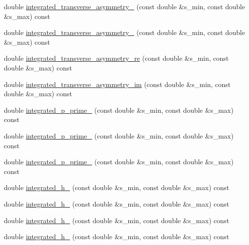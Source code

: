 \begin{DoxyCompactItemize}
\item 
double \hyperlink{classeos_1_1BToKstarDilepton_3_01LargeRecoil_01_4_a745412c6ccdb663f905f06be923082f2}{integrated\_\-transverse\_\-asymmetry\_} (const double \&s\_\-min, const double \&s\_\-max) const 
\item 
double \hyperlink{classeos_1_1BToKstarDilepton_3_01LargeRecoil_01_4_aff2ff1bed79cb777349b6e9bdf20cd66}{integrated\_\-transverse\_\-asymmetry\_} (const double \&s\_\-min, const double \&s\_\-max) const 
\item 
double \hyperlink{classeos_1_1BToKstarDilepton_3_01LargeRecoil_01_4_a535ddfbdc0000407bd98814504308556}{integrated\_\-transverse\_\-asymmetry\_\-re} (const double \&s\_\-min, const double \&s\_\-max) const 
\item 
double \hyperlink{classeos_1_1BToKstarDilepton_3_01LargeRecoil_01_4_a2e38ce6db1732ee1452203414b9c7280}{integrated\_\-transverse\_\-asymmetry\_\-im} (const double \&s\_\-min, const double \&s\_\-max) const 
\item 
double \hyperlink{classeos_1_1BToKstarDilepton_3_01LargeRecoil_01_4_a9c42a3d8488509596ae4292000e03010}{integrated\_\-p\_\-prime\_} (const double \&s\_\-min, const double \&s\_\-max) const 
\item 
double \hyperlink{classeos_1_1BToKstarDilepton_3_01LargeRecoil_01_4_a53a468080844fbd3966da39a70018d5f}{integrated\_\-p\_\-prime\_} (const double \&s\_\-min, const double \&s\_\-max) const 
\item 
double \hyperlink{classeos_1_1BToKstarDilepton_3_01LargeRecoil_01_4_a4c040333bb5e90385f38c6990cf7dacc}{integrated\_\-p\_\-prime\_} (const double \&s\_\-min, const double \&s\_\-max) const 
\item 
double \hyperlink{classeos_1_1BToKstarDilepton_3_01LargeRecoil_01_4_a9406f153b7bcda724228031edccb4eff}{integrated\_\-h\_} (const double \&s\_\-min, const double \&s\_\-max) const 
\item 
double \hyperlink{classeos_1_1BToKstarDilepton_3_01LargeRecoil_01_4_ace2820ec3a4e8d3eda907e764ab57c22}{integrated\_\-h\_} (const double \&s\_\-min, const double \&s\_\-max) const 
\item 
double \hyperlink{classeos_1_1BToKstarDilepton_3_01LargeRecoil_01_4_aa2dd5c9566afd338c8edf08fc81f488a}{integrated\_\-h\_} (const double \&s\_\-min, const double \&s\_\-max) const 
\item 
double \hyperlink{classeos_1_1BToKstarDilepton_3_01LargeRecoil_01_4_ad896f9ffdac50023898990437c9c8852}{integrated\_\-h\_} (const double \&s\_\-min, const double \&s\_\-max) const 

\end{DoxyCompactItemize}
